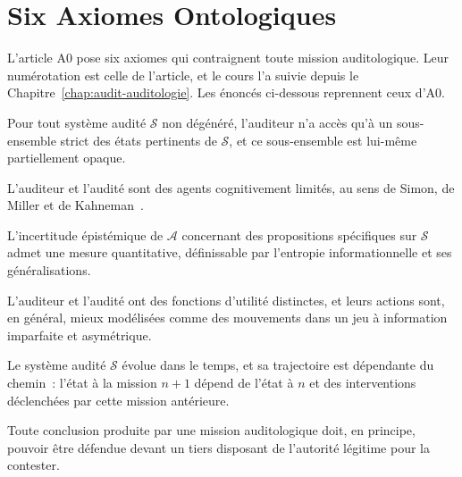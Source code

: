 \section{Six Axiomes Ontologiques}
\label{sec:c21-axiomes}

L'article A0 pose six axiomes qui contraignent toute mission
auditologique. Leur numérotation est celle de l'article, et le cours l'a
suivie depuis le Chapitre~\ref{chap:audit-auditologie}. Les énoncés
ci-dessous reprennent ceux d'A0.

\begin{axiome}
Pour tout système audité $\mathcal{S}$ non dégénéré, l'auditeur n'a accès
qu'à un sous-ensemble strict des états pertinents de $\mathcal{S}$, et ce
sous-ensemble est lui-même partiellement opaque.
\end{axiome}

\begin{axiome}
L'auditeur et l'audité sont des agents cognitivement limités, au sens de
Simon, de Miller et de Kahneman~\cite{simon1957,miller1956,kahneman2011}.
\end{axiome}

\begin{axiome}
L'incertitude épistémique de $\mathcal{A}$ concernant des propositions
spécifiques sur $\mathcal{S}$ admet une mesure quantitative, définissable
par l'entropie informationnelle et ses généralisations.
\end{axiome}

\begin{axiome}
L'auditeur et l'audité ont des fonctions d'utilité distinctes, et leurs
actions sont, en général, mieux modélisées comme des mouvements dans un jeu
à information imparfaite et asymétrique.
\end{axiome}

\begin{axiome}
Le système audité $\mathcal{S}$ évolue dans le temps, et sa trajectoire est
dépendante du chemin~: l'état à la mission $n+1$ dépend de l'état à $n$ et
des interventions déclenchées par cette mission antérieure.
\end{axiome}

\begin{axiome}[Opposabilité]
Toute conclusion produite par une mission auditologique doit, en principe,
pouvoir être défendue devant un tiers disposant de l'autorité légitime pour
la contester.
\end{axiome}

